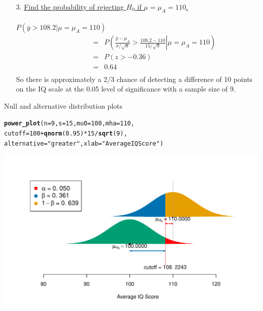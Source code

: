 \documentclass[handout]{beamer}\usepackage[]{graphicx}\usepackage[]{color}
\newcommand{\hlnum}[1]{\textcolor[rgb]{0.686,0.059,0.569}{#1}}%
\newcommand{\hlstr}[1]{\textcolor[rgb]{0.192,0.494,0.8}{#1}}%
\newcommand{\hlopt}[1]{\textcolor[rgb]{0,0,0}{#1}}%
\newcommand{\hlstd}[1]{\textcolor[rgb]{0.345,0.345,0.345}{#1}}%
\newcommand{\hlkwc}[1]{\textcolor[rgb]{0.333,0.667,0.333}{#1}}%
\newcommand{\hlkwd}[1]{\textcolor[rgb]{0.737,0.353,0.396}{\textbf{#1}}}%
\newenvironment{knitrout}{}{} %
\begin{document}
{	\begin{enumerate}
		\item[3.] \underline{Find the probability of rejecting $H_0$ if
			$\mu=\mu_A=110$.}\\ \ \\
		$P(\overline{y} > 108.2|\mu=\mu_A=110) $
		\begin{eqnarray*} \qquad \qquad & = &
			P\left(\left.\frac{\overline{y}-\mu_A}{\sigma/\sqrt{n}}
			> \frac{108.2-110}{15/\sqrt{9}}\right|\mu=\mu_A=110\right)\\
			& = & P\left(z > -0.36\right)\\
			& = & 0.64\\
		\end{eqnarray*}
		So there is approximately a 2/3 chance of detecting a difference of
		10 points on the IQ scale at the 0.05 level of significance with a
		sample size of 9.
	\end{enumerate}
} 


\begin{frame}[fragile]{Null and alternative distribution plots}
\begin{knitrout}\scriptsize
{}\color{fgcolor}
\begin{alltt}
\hlkwd{power_plot}\hlstd{(}\hlkwc{n} \hlstd{=} \hlnum{9}\hlstd{,} \hlkwc{s} \hlstd{=} \hlnum{15}\hlstd{,} \hlkwc{mu0} \hlstd{=} \hlnum{100}\hlstd{,} \hlkwc{mha} \hlstd{=} \hlnum{110}\hlstd{,}
        \hlkwc{cutoff} \hlstd{=} \hlnum{100} \hlopt{+} \hlkwd{qnorm}\hlstd{(}\hlnum{0.95}\hlstd{)} \hlopt{*} \hlnum{15} \hlopt{/} \hlkwd{sqrt}\hlstd{(}\hlnum{9}\hlstd{),}
        \hlkwc{alternative} \hlstd{=} \hlstr{"greater"}\hlstd{,} \hlkwc{xlab} \hlstd{=} \hlstr{"Average IQ Score"}\hlstd{)}
\end{alltt}


{\centering \includegraphics[width=1\linewidth]{figure/unnamed-chunk-17-1} 

}



\end{knitrout}
\end{frame}
\end{document}
